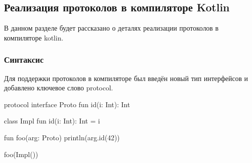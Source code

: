 \subsection{Реализация протоколов в компиляторе Kotlin}
В данном разделе будет рассказано о деталях реализации протоколов в компиляторе kotlin.

\subsubsection{Синтаксис}
Для поддержки протоколов в компиляторе был введён новый тип интерфейсов и добавлено ключевое слово protocol.

\begin{pyglist}[language=kotlin]
protocol interface Proto {
    fun id(i: Int): Int
}

class Impl {
    fun id(i: Int): Int = i
}

fun foo(arg: Proto) {
    println(arg.id(42))
}

foo(Impl())
\end{pyglist}

